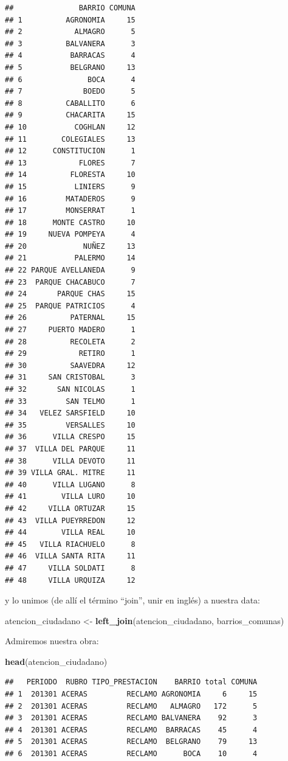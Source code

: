 \documentclass[spanish,]{book}
\newenvironment{Shaded}{\begin{snugshade}}{\end{snugshade}}
\newcommand{\KeywordTok}[1]{\textcolor[rgb]{0.13,0.29,0.53}{\textbf{#1}}}
\newcommand{\NormalTok}[1]{#1}
\newcommand{\StringTok}[1]{\textcolor[rgb]{0.31,0.60,0.02}{#1}}
\begin{document}
\begin{verbatim}
##               BARRIO COMUNA
## 1          AGRONOMIA     15
## 2            ALMAGRO      5
## 3          BALVANERA      3
## 4           BARRACAS      4
## 5           BELGRANO     13
## 6               BOCA      4
## 7              BOEDO      5
## 8          CABALLITO      6
## 9          CHACARITA     15
## 10           COGHLAN     12
## 11        COLEGIALES     13
## 12      CONSTITUCION      1
## 13            FLORES      7
## 14          FLORESTA     10
## 15           LINIERS      9
## 16         MATADEROS      9
## 17         MONSERRAT      1
## 18      MONTE CASTRO     10
## 19     NUEVA POMPEYA      4
## 20             NUÑEZ     13
## 21           PALERMO     14
## 22 PARQUE AVELLANEDA      9
## 23  PARQUE CHACABUCO      7
## 24       PARQUE CHAS     15
## 25  PARQUE PATRICIOS      4
## 26          PATERNAL     15
## 27     PUERTO MADERO      1
## 28          RECOLETA      2
## 29            RETIRO      1
## 30          SAAVEDRA     12
## 31     SAN CRISTOBAL      3
## 32       SAN NICOLAS      1
## 33         SAN TELMO      1
## 34   VELEZ SARSFIELD     10
## 35         VERSALLES     10
## 36      VILLA CRESPO     15
## 37  VILLA DEL PARQUE     11
## 38      VILLA DEVOTO     11
## 39 VILLA GRAL. MITRE     11
## 40      VILLA LUGANO      8
## 41        VILLA LURO     10
## 42     VILLA ORTUZAR     15
## 43  VILLA PUEYRREDON     12
## 44        VILLA REAL     10
## 45   VILLA RIACHUELO      8
## 46  VILLA SANTA RITA     11
## 47     VILLA SOLDATI      8
## 48     VILLA URQUIZA     12
\end{verbatim}

y lo unimos (de allí el término ``join'', unir en inglés) a nuestra data:

\begin{Shaded}
\begin{Highlighting}[]
\NormalTok{atencion_ciudadano <-}\StringTok{ }\KeywordTok{left_join}\NormalTok{(atencion_ciudadano, barrios_comunas)}
\end{Highlighting}
\end{Shaded}

Admiremos nuestra obra:

\begin{Shaded}
\begin{Highlighting}[]
\KeywordTok{head}\NormalTok{(atencion_ciudadano)}
\end{Highlighting}
\end{Shaded}

\begin{verbatim}
##   PERIODO  RUBRO TIPO_PRESTACION    BARRIO total COMUNA
## 1  201301 ACERAS         RECLAMO AGRONOMIA     6     15
## 2  201301 ACERAS         RECLAMO   ALMAGRO   172      5
## 3  201301 ACERAS         RECLAMO BALVANERA    92      3
## 4  201301 ACERAS         RECLAMO  BARRACAS    45      4
## 5  201301 ACERAS         RECLAMO  BELGRANO    79     13
## 6  201301 ACERAS         RECLAMO      BOCA    10      4
\end{verbatim}
\end{document}
